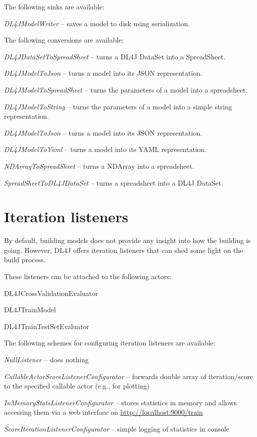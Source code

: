 \documentclass[a4paper]{book}
\begin{document}
The following sinks are available:
\begin{tight_itemize}
  \item \textit{DL4JModelWriter} -- saves a model to disk using serialization.
\end{tight_itemize}

The following conversions are available:
\begin{tight_itemize}
  \item \textit{DL4JDataSetToSpreadSheet} -- turns a DL4J DataSet into a SpreadSheet.
  \item \textit{DL4JModelToJson} -- turns a model into its JSON\cite{json} representation.
  \item \textit{DL4JModelToSpreadSheet} -- turns the parameters of a model into a spreadsheet.
  \item \textit{DL4JModelToString} -- turns the parameters of a model into a simple string representation.
  \item \textit{DL4JModelToJson} -- turns a model into its JSON\cite{json} representation.
  \item \textit{DL4JModelToYaml} -- turns a model into its YAML\cite{yaml} representation.
  \item \textit{NDArrayToSpreadSheet} -- turns a NDArray into a spreadsheet.
  \item \textit{SpreadSheetToDL4JDataSet} -- turns a spreadsheet into a DL4J DataSet.
\end{tight_itemize}

\section{Iteration listeners}
By default, building models does not provide any insight into how the building
is going. However, DL4J offers iteration listeners that can shed some light
on the build process.

These listeners can be attached to the following actors:
\begin{tight_itemize}
  \item DL4JCrossValidationEvaluator
  \item DL4JTrainModel
  \item DL4JTrainTestSetEvaluator
\end{tight_itemize}

The following schemes for configuring iteration listeners are available:
\begin{tight_itemize}
  \item \textit{NullListener} -- does nothing
  \item \textit{CallableActorScoreListenerConfigurator} -- forwards double array
  of iteration/score to the specified callable actor (e.g., for plotting)
  \item \textit{InMemoryStatsListenerConfigurator} -- stores statistics in memory
  and allows accessing them via a web interface on \url{http://localhost:9000/train}{}
  \item \textit{ScoreIterationListenerConfigurator} -- simple logging of
  statistics in console
\end{tight_itemize}
\end{document}
